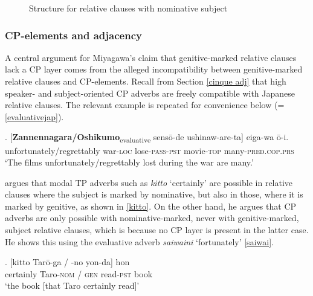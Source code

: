 \begin{figure}
\centering
{}
\caption{Structure for relative clauses with nominative subject \citep[147]{miyagawa:2017:agreement}}
\label{Rc with nominative miyagawa}
\end{figure}

\subsubsection{CP-elements and adjacency}

A central argument for Miyagawa's claim that genitive-marked relative clauses lack a CP layer comes from the alleged incompatibility between genitive-marked relative clauses and CP-elements. Recall from Section \ref{cinque adj} that high speaker- and subject-oriented CP adverbs are freely compatible with Japanese relative clauses. The relevant example is repeated for convenience below (= \ref{evaluativejap}).

\exg. [\textbf{Zannennagara/Oshikumo}\textsubscript{evaluative} sensō-de ushinaw-are-ta] eiga-wa ō-i.\\
unfortunately/regrettably war-\textsc{loc} lose-\textsc{pass-pst} movie-\textsc{top} many-\textsc{pred.cop.prs}\\
`The films unfortunately/regrettably lost during the war are many.’

\citet[1273]{miyagawa:2011:genitive} argues that modal TP adverbs such as \textit{kitto} `certainly' are possible in relative clauses where the subject is marked by nominative, but also in those, where it is marked by genitive, as shown in \ref{kitto}. On the other hand, he argues that CP adverbs are only possible with nominative-marked, never with genitive-marked, subject relative clauses, which is because no CP layer is present in the latter case. He shows this using the evaluative adverb \textit{saiwaini} `fortunately' \ref{saiwai}. 

\exg. [kitto Tarō-ga / -no yon-da] hon\\
certainly Taro-\textsc{nom} / \textsc{gen} read-\textsc{pst} book\\
`the book [that Taro certainly read]’ \null \hfill \citep[1273]{miyagawa:2011:genitive} \label{kitto}

